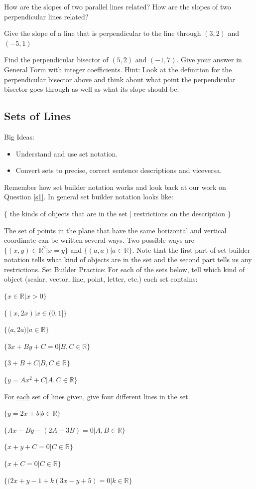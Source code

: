 \bq How are the slopes of two parallel lines related? How are the slopes of two perpendicular lines related?
\eq

\bq Give the slope of a line that is perpendicular to the line through $(3,2)$ and $(-5,1)$
\eq

\bq Find the perpendicular bisector of $(5,2)$ and $(-1,7)$. Give your answer in General Form with integer coefficients. Hint: Look at the definition for the perpendicular bisector above and think about what point the perpendicular bisector goes through as well as what its slope should be.
\eq

\subsection{Sets of Lines}

Big Ideas:
\begin{itemize}
\item Understand and use set notation.
\item Convert sets to precise, correct sentence descriptions and viceversa.
\end{itemize}

Remember how set builder notation works and look back at our work on Question \ref{s1}. In general set builder notation looks like:

$\{ $ the kinds of objects that are in the set $|$ restrictions on the description $\}$

The set of points in the plane that have the same horizontal and vertical coordinate can be written several ways. Two possible ways are $\{ (x,y) \in \mathbb{R}^2 | x=y\}$ and $\{(a,a)|a \in \mathbb{R} \}$. Note that the first part of set builder notation tells what kind of objects are in the set and the second part tells us any restrictions.
\bq
Set Builder Practice: For each of the sets below, tell which kind of object (scalar, vector, line, point, letter, etc.) each set contains:
\be
\item $\{ x \in \mathbb{R} | x >0 \}$
\item $\{ (x,2x) | x \in (0,1] \}$
\item $\{ \langle a,2a \rangle | a \in \mathbb{R} \}$
\item $\{ 3x+By+C=0 | B,C \in \mathbb{R} \}$
\item $\{ 3+B+C | B,C \in \mathbb{R} \}$
\item $\{ y=A x^2 +C | A,C \in \mathbb{R} \}$
\ee
\eq

\bq For \underline{each} set of lines given, give four different lines in the set.
\be
\item $\{ y=2x+b| b \in \mathbb{R}\}$
\item $\{ Ax-By-(2A-3B)=0| A,B \in \mathbb{R} \}$
\item $\{ x+y+C=0| C \in \mathbb{R} \}$
\item $\{ x+C=0| C \in \mathbb{R}\}$
\item $\{ (2x+y-1+k(3x-y+5)=0| k \in \mathbb{R}\}$
\ee
\eq


